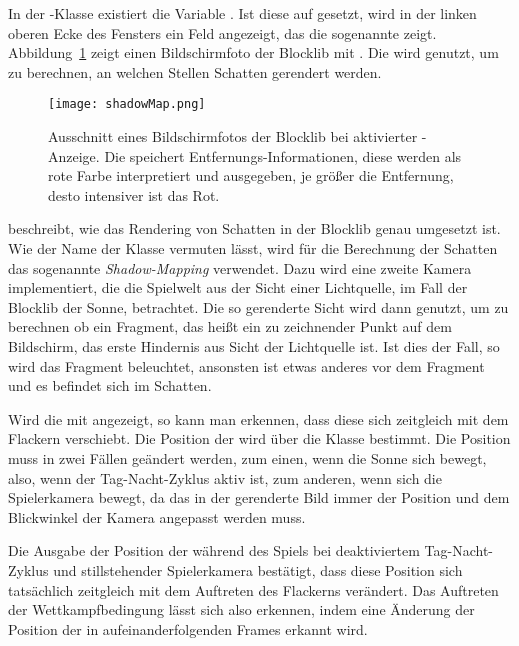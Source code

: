 In der \classConfiguration{}-Klasse existiert die Variable . Ist diese auf  gesetzt, wird in der linken oberen Ecke des Fensters ein Feld angezeigt, das die sogenannte \classShadowMap{} zeigt. Abbildung~\ref{fig:ShadowMap} zeigt einen Bildschirmfoto der Blocklib mit . Die \classShadowMap{} wird genutzt, um zu berechnen, an welchen Stellen Schatten gerendert werden.
\begin{figure}
	\centering
	\texttt{[image: shadowMap.png]}
	\caption[Ausschnitt eines Bildschirmfotos der Blocklib bei aktivierter \classShadowMap{}-Anzeige.]{Ausschnitt eines Bildschirmfotos der Blocklib bei aktivierter \classShadowMap{}-Anzeige. Die \classShadowMap{} speichert Entfernungs-Informationen, diese werden als rote Farbe interpretiert und ausgegeben, je größer die Entfernung, desto intensiver ist das Rot.}\label{fig:ShadowMap}
\end{figure}
\textcite{Ebbinger2018} beschreibt, wie das Rendering von Schatten in der Blocklib genau umgesetzt ist. Wie der Name der Klasse \classShadowMap{} vermuten lässt, wird für die Berechnung der Schatten das sogenannte \emph{Shadow-Mapping} verwendet. Dazu wird eine zweite Kamera implementiert, die die Spielwelt aus der Sicht einer Lichtquelle, im Fall der Blocklib der Sonne, betrachtet. Die so gerenderte Sicht wird dann genutzt, um zu berechnen ob ein Fragment, das heißt ein zu zeichnender Punkt auf dem Bildschirm, das erste Hindernis aus Sicht der Lichtquelle ist. Ist dies der Fall, so wird das Fragment beleuchtet, ansonsten ist etwas anderes vor dem Fragment und es befindet sich im Schatten.

Wird die \classShadowMap{} mit angezeigt, so kann man erkennen, dass diese sich zeitgleich mit dem Flackern verschiebt. Die Position der \classShadowMap{} wird über die Klasse \classShadowBounds{} bestimmt. Die Position muss in zwei Fällen geändert werden, zum einen, wenn die Sonne sich bewegt, also, wenn der Tag-Nacht-Zyklus aktiv ist, zum anderen, wenn sich die Spielerkamera bewegt, da das in der \classShadowMap{} gerenderte Bild immer der Position und dem Blickwinkel der Kamera angepasst werden muss.

Die Ausgabe der Position der \classShadowBounds{} während des Spiels bei deaktiviertem Tag-Nacht-Zyklus und stillstehender Spielerkamera bestätigt, dass diese Position sich tatsächlich zeitgleich mit dem Auftreten des Flackerns verändert. Das Auftreten der Wettkampfbedingung lässt sich also erkennen, indem eine Änderung der Position der \classShadowBounds{} in aufeinanderfolgenden Frames erkannt wird.

